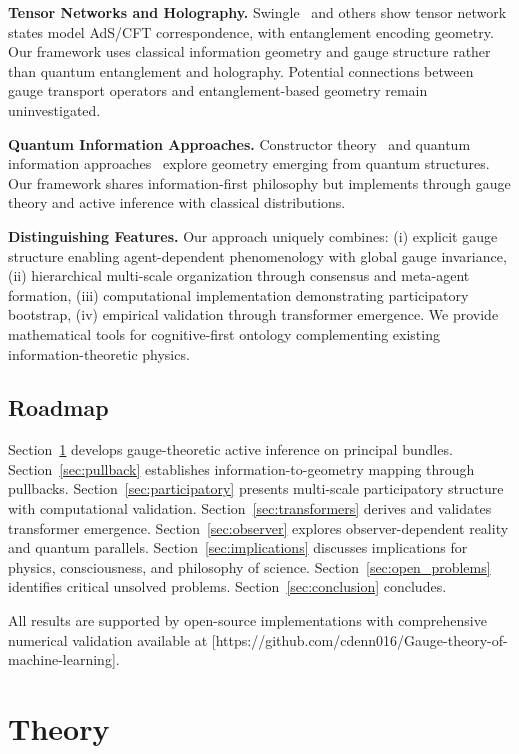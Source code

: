 \documentclass[11pt]{article}
\begin{document}
\textbf{Tensor Networks and Holography.} Swingle~\cite{Swingle2012} and others show tensor network states model AdS/CFT correspondence, with entanglement encoding geometry. Our framework uses classical information geometry and gauge structure rather than quantum entanglement and holography. Potential connections between gauge transport operators and entanglement-based geometry remain uninvestigated.

\textbf{Quantum Information Approaches.} Constructor theory~\cite{Deutsch2015} and quantum information approaches~\cite{Cao2017} explore geometry emerging from quantum structures. Our framework shares information-first philosophy but implements through gauge theory and active inference with classical distributions.

\textbf{Distinguishing Features.} Our approach uniquely combines: (i) explicit gauge structure enabling agent-dependent phenomenology with global gauge invariance, (ii) hierarchical multi-scale organization through consensus and meta-agent formation, (iii) computational implementation demonstrating participatory bootstrap, (iv) empirical validation through transformer emergence. We provide mathematical tools for cognitive-first ontology complementing existing information-theoretic physics.

\subsection{Roadmap}

Section~\ref{sec:framework} develops gauge-theoretic active inference on principal bundles. Section~\ref{sec:pullback} establishes information-to-geometry mapping through pullbacks. Section~\ref{sec:participatory} presents multi-scale participatory structure with computational validation. Section~\ref{sec:transformers} derives and validates transformer emergence. Section~\ref{sec:observer} explores observer-dependent reality and quantum parallels. Section~\ref{sec:implications} discusses implications for physics, consciousness, and philosophy of science. Section~\ref{sec:open_problems} identifies critical unsolved problems. Section~\ref{sec:conclusion} concludes.

All results are supported by open-source implementations with comprehensive numerical validation available at [https://github.com/cdenn016/Gauge-theory-of-machine-learning].

\section{Theory}
\label{sec:framework}
\end{document}
